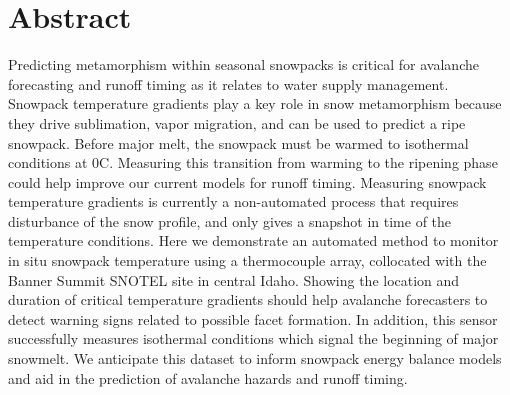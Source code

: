 \chapter*{Abstract}

Predicting metamorphism within seasonal snowpacks is critical for avalanche forecasting and runoff timing as it relates to water supply management. Snowpack temperature gradients play a key role in snow metamorphism because they drive sublimation, vapor migration, and can be used to predict a ripe snowpack. Before major melt, the snowpack must be warmed to isothermal conditions at 0\textdegree C. Measuring this transition from warming to the ripening phase could help improve our current models for runoff timing. Measuring snowpack temperature gradients is currently a non-automated process that requires disturbance of the snow profile, and only gives a snapshot in time of the temperature conditions. Here we demonstrate an automated method to monitor in situ snowpack temperature using a thermocouple array, collocated with the Banner Summit SNOTEL site in central Idaho. Showing the location and duration of critical temperature gradients should help avalanche forecasters to detect warning signs related to possible facet formation. In addition, this sensor successfully measures isothermal conditions which signal the beginning of major snowmelt. We anticipate this dataset to inform snowpack energy balance models and aid in the prediction of avalanche hazards and runoff timing.
